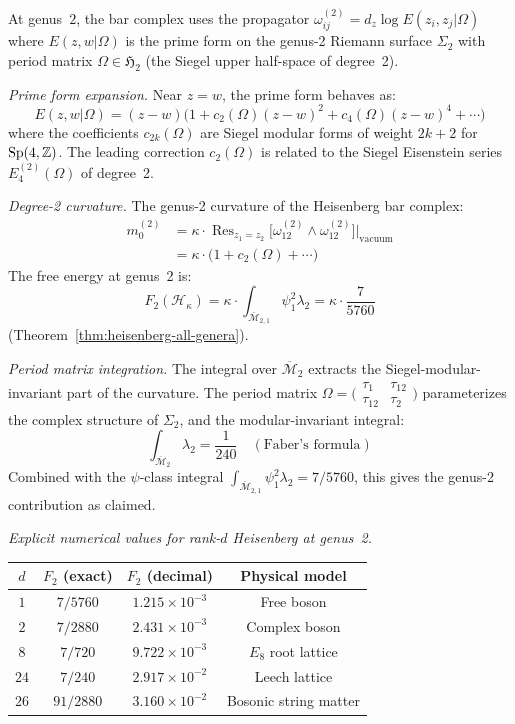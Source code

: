 \begin{computation}
\label{comp:heisenberg-genus2-period}

At genus~$2$, the bar complex uses the propagator
$\omega_{ij}^{(2)} = d_z \log E(z_i, z_j|\Omega)$ where
$E(z,w|\Omega)$ is the prime form on the genus-2 Riemann surface
$\Sigma_2$ with period matrix $\Omega \in \mathfrak{H}_2$ (the
Siegel upper half-space of degree~2).

\emph{Prime form expansion.}
Near $z = w$, the prime form behaves as:
\[
E(z,w|\Omega) = (z-w)\bigl(1 + c_2(\Omega)(z-w)^2
+ c_4(\Omega)(z-w)^4 + \cdots\bigr)
\]
where the coefficients $c_{2k}(\Omega)$ are Siegel modular forms of
weight $2k+2$ for $\mathrm{Sp}(4, \mathbb{Z})$.  The leading correction
$c_2(\Omega)$ is related to the Siegel Eisenstein series
$E_4^{(2)}(\Omega)$ of degree~2.

\emph{Degree-2 curvature.}
The genus-2 curvature of the Heisenberg bar complex:
\begin{align}
m_0^{(2)} &= \kappa \cdot
\operatorname{Res}_{z_1 = z_2}\bigl[\omega_{12}^{(2)}
\wedge \omega_{12}^{(2)}\bigr]\big|_{\text{vacuum}} \\
&= \kappa \cdot \bigl(1 + c_2(\Omega) + \cdots\bigr)
\end{align}
The free energy at genus~2 is:
\[
F_2(\mathcal{H}_\kappa) = \kappa \cdot \int_{\overline{\mathcal{M}}_{2,1}}
\psi_1^2 \lambda_2 = \kappa \cdot \frac{7}{5760}
\]
(Theorem~\ref{thm:heisenberg-all-genera}).

\emph{Period matrix integration.}
The integral over $\overline{\mathcal{M}}_2$ extracts the
Siegel-modular-invariant part of the curvature.  The period matrix
$\Omega = \bigl(\begin{smallmatrix} \tau_1 & \tau_{12} \\
\tau_{12} & \tau_2 \end{smallmatrix}\bigr)$ parameterizes the
complex structure of $\Sigma_2$, and the modular-invariant
integral:
\[
\int_{\overline{\mathcal{M}}_2} \lambda_2
= \frac{1}{240} \quad (\text{Faber's formula})
\]
Combined with the $\psi$-class integral
$\int_{\overline{\mathcal{M}}_{2,1}} \psi_1^2 \lambda_2
= 7/5760$, this gives the genus-2 contribution as claimed.

\emph{Explicit numerical values for rank-$d$ Heisenberg at genus~2.}
\begin{center}
\renewcommand{\arraystretch}{1.2}
\begin{tabular}{c|ccc}
$d$ & $F_2$ (exact) & $F_2$ (decimal) & Physical model \\
\hline
$1$ & $7/5760$ & $1.215 \times 10^{-3}$ & Free boson \\
$2$ & $7/2880$ & $2.431 \times 10^{-3}$ & Complex boson \\
$8$ & $7/720$ & $9.722 \times 10^{-3}$ & $E_8$ root lattice \\
$24$ & $7/240$ & $2.917 \times 10^{-2}$ & Leech lattice \\
$26$ & $91/2880$ & $3.160 \times 10^{-2}$ & Bosonic string matter
\end{tabular}
\end{center}
\end{computation}


